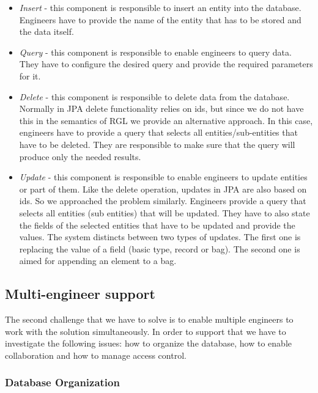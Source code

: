 \begin{itemize}
	\item \textit{Insert} - this component is responsible to insert an entity into the database. Engineers have to provide the name of the entity that has to be stored and the data itself.
	
	\item \textit{Query} - this component is responsible to enable engineers to query data. They have to configure the desired query and provide the required parameters for it.
	
	\item \textit{Delete} - this component is responsible to delete data from the database. Normally in JPA delete functionality relies on ids, but since we do not have this in the semantics of RGL we provide an alternative approach. In this case, engineers have to provide a query that selects all entities/sub-entities that have to be deleted. They are responsible to make sure that the query will produce only the needed results.
	
	\item \textit{Update} - this component is responsible to enable engineers to update entities or part of them. Like the delete operation, updates in JPA are also based on ids. So we approached the problem similarly. Engineers provide a query that selects all entities (sub entities) that will be updated. They have to also state the fields of the selected entities that have to be updated and provide the values. The system distincts between two types of updates. The first one is replacing the value of a field (basic type, record or bag). The second one is aimed for appending an element to a bag.
\end{itemize}

\subsection{Multi-engineer support}

The second challenge that we have to solve is to enable multiple engineers to work with the solution simultaneously. In order to support that we have to investigate the following issues: how to organize the database, how to enable collaboration and how to manage access control.

\subsubsection{Database Organization}

